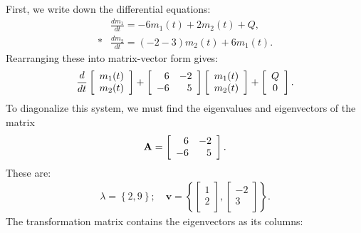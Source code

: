 First, we write down the differential equations:
\begin{subequations}
\begin{align}
  &\frac{dm_1}{dt} = -6 m_1(t) + 2 m_2(t) + Q, \\*
  &\frac{dm_2}{dt} = (-2 - 3) m_2(t) + 6 m_1(t). 
\end{align}
\end{subequations}
Rearranging these into matrix-vector form gives:
\begin{align}
  \frac{d}{dt} \left[ \begin{array}{c} m_1(t) \\ m_2(t) \\ \end{array} \right]
  + \left[ \begin{array}{r r}
   6 & -2 \\
  -6 &  5 \\ \end{array} \right]
  \left[ \begin{array}{c} m_1(t) \\ m_2(t) \\ \end{array} \right]
  + \left[ \begin{array}{c} Q \\ 0 \\ \end{array} \right] .
\end{align}
To diagonalize this system, we must find the eigenvalues and eigenvectors of the matrix
\begin{align}
  \mathbf{A} = \left[ \begin{array}{r r}
   6 & -2 \\
  -6 &  5 \\ \end{array} \right].
\end{align}
These are:
\begin{align}
  \lambda = \left\{ 2, 9 \right\}; 
  \quad \mathbf{v} = \left\{  
  \left[ \begin{array}{r}  1 \\ 2 \\ \end{array} \right] ,
  \left[ \begin{array}{r} -2 \\ 3 \\ \end{array} \right] \right\} .
\end{align}
The transformation matrix contains the eigenvectors as its columns:
